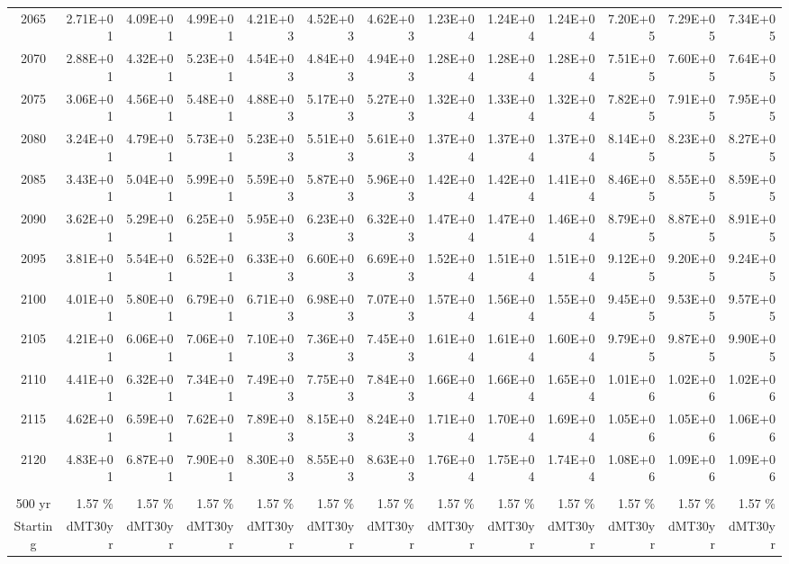 \documentclass{article}
\begin{document}
\begin{table}
\begin{tabular}{crrr|rrr|rrr|rrr}
2065     & 2.71E+01 & 4.09E+01 & 4.99E+01 & 4.21E+03 & 4.52E+03 & 4.62E+03 & 1.23E+04 & 1.24E+04 & 1.24E+04 & 7.20E+05 & 7.29E+05 & 7.34E+05 \\
2070     & 2.88E+01 & 4.32E+01 & 5.23E+01 & 4.54E+03 & 4.84E+03 & 4.94E+03 & 1.28E+04 & 1.28E+04 & 1.28E+04 & 7.51E+05 & 7.60E+05 & 7.64E+05 \\
2075     & 3.06E+01 & 4.56E+01 & 5.48E+01 & 4.88E+03 & 5.17E+03 & 5.27E+03 & 1.32E+04 & 1.33E+04 & 1.32E+04 & 7.82E+05 & 7.91E+05 & 7.95E+05 \\
2080     & 3.24E+01 & 4.79E+01 & 5.73E+01 & 5.23E+03 & 5.51E+03 & 5.61E+03 & 1.37E+04 & 1.37E+04 & 1.37E+04 & 8.14E+05 & 8.23E+05 & 8.27E+05 \\
2085     & 3.43E+01 & 5.04E+01 & 5.99E+01 & 5.59E+03 & 5.87E+03 & 5.96E+03 & 1.42E+04 & 1.42E+04 & 1.41E+04 & 8.46E+05 & 8.55E+05 & 8.59E+05 \\
2090     & 3.62E+01 & 5.29E+01 & 6.25E+01 & 5.95E+03 & 6.23E+03 & 6.32E+03 & 1.47E+04 & 1.47E+04 & 1.46E+04 & 8.79E+05 & 8.87E+05 & 8.91E+05 \\
2095     & 3.81E+01 & 5.54E+01 & 6.52E+01 & 6.33E+03 & 6.60E+03 & 6.69E+03 & 1.52E+04 & 1.51E+04 & 1.51E+04 & 9.12E+05 & 9.20E+05 & 9.24E+05 \\
2100     & 4.01E+01 & 5.80E+01 & 6.79E+01 & 6.71E+03 & 6.98E+03 & 7.07E+03 & 1.57E+04 & 1.56E+04 & 1.55E+04 & 9.45E+05 & 9.53E+05 & 9.57E+05 \\
2105     & 4.21E+01 & 6.06E+01 & 7.06E+01 & 7.10E+03 & 7.36E+03 & 7.45E+03 & 1.61E+04 & 1.61E+04 & 1.60E+04 & 9.79E+05 & 9.87E+05 & 9.90E+05 \\
2110     & 4.41E+01 & 6.32E+01 & 7.34E+01 & 7.49E+03 & 7.75E+03 & 7.84E+03 & 1.66E+04 & 1.66E+04 & 1.65E+04 & 1.01E+06 & 1.02E+06 & 1.02E+06 \\
2115     & 4.62E+01 & 6.59E+01 & 7.62E+01 & 7.89E+03 & 8.15E+03 & 8.24E+03 & 1.71E+04 & 1.70E+04 & 1.69E+04 & 1.05E+06 & 1.05E+06 & 1.06E+06 \\
2120     & 4.83E+01 & 6.87E+01 & 7.90E+01 & 8.30E+03 & 8.55E+03 & 8.63E+03 & 1.76E+04 & 1.75E+04 & 1.74E+04 & 1.08E+06 & 1.09E+06 & 1.09E+06 \\
         &          &          &          &          &          &          &          &          &          &          &          &          \\ \hline
500 yr   & 1.57 \%  & 1.57 \%  & 1.57 \%  & 1.57 \%  & 1.57 \%  & 1.57 \%  & 1.57 \%  & 1.57 \%  & 1.57 \%  & 1.57 \%  & 1.57 \%  & 1.57 \%  \\
Starting & dMT30yr  & dMT30yr  & dMT30yr  & dMT30yr  & dMT30yr  & dMT30yr  & dMT30yr  & dMT30yr  & dMT30yr  & dMT30yr  & dMT30yr  & dMT30yr  \\

\end{tabular}
\end{table}
\end{document}
